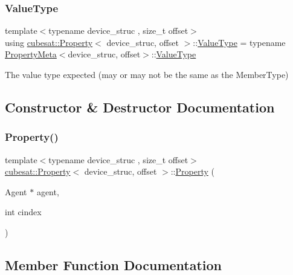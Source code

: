 \subsubsection{\texorpdfstring{Value\+Type}{ValueType}}
{\footnotesize\ttfamily template$<$typename device\+\_\+struc , size\+\_\+t offset$>$ \\
using \hyperlink{structcubesat_1_1Property}{cubesat\+::\+Property}$<$ device\+\_\+struc, offset $>$\+::\hyperlink{structcubesat_1_1Property_a24aaec6241faac15f50c63bb6c972fd4}{Value\+Type} =  typename \hyperlink{structcubesat_1_1PropertyMeta}{Property\+Meta}$<$device\+\_\+struc, offset$>$\+::\hyperlink{structcubesat_1_1Property_a24aaec6241faac15f50c63bb6c972fd4}{Value\+Type}}



The value type expected (may or may not be the same as the Member\+Type) 



\subsection{Constructor \& Destructor Documentation}
\mbox{\label{structcubesat_1_1Property_a12f691402fdf35461ddad1c88a6142d8}} 
\subsubsection{\texorpdfstring{Property()}{Property()}}
{\footnotesize\ttfamily template$<$typename device\+\_\+struc , size\+\_\+t offset$>$ \\
\hyperlink{structcubesat_1_1Property}{cubesat\+::\+Property}$<$ device\+\_\+struc, offset $>$\+::\hyperlink{structcubesat_1_1Property}{Property} (\begin{DoxyParamCaption}\item[{Agent $\ast$}]{agent,  }\item[{int}]{cindex }\end{DoxyParamCaption})\hspace{0.3cm}{\ttfamily [inline]}}



\subsection{Member Function Documentation}
\mbox{\label{structcubesat_1_1Property_ac8aa543ac4a3ea760a2291ad408b34ff}} 
